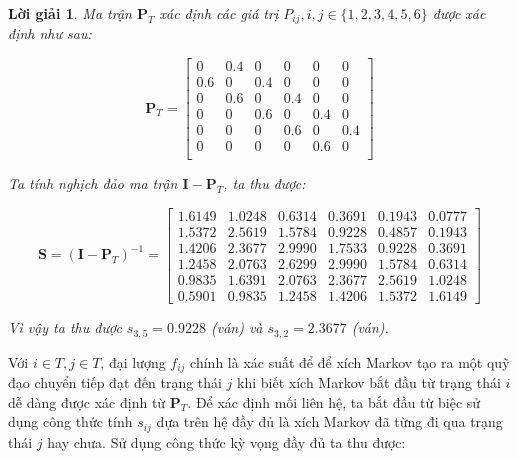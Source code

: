 \documentclass[14pt, a4paper]{article}
\numberwithin{equation}{section}
\numberwithin{figure}{section}
\theoremstyle{sltheorem}
\theoremstyle{soltheorem}
\newtheorem*{loigiai}{Lời giải}
\numberwithin{dl}{section}
\numberwithin{vd}{section}
\begin{document}
    \begin{loigiai}
        Ma trận $\mathbf{P}_T$ xác định các giá trị $P_{ij}, i, j \in \lbrace 1, 2, 3, 4, 5, 6 \rbrace$ được xác định như sau:

        \begin{equation*}
            \mathbf{P}_T = \begin{bmatrix}
                0 & 0.4 & 0 & 0 & 0 & 0 \\
                0.6 & 0 & 0.4 & 0 & 0 & 0 \\
                0 & 0.6 & 0 & 0.4 & 0 & 0 \\
                0 & 0 & 0.6 & 0 & 0.4 & 0 \\
                0 & 0 & 0 & 0.6 & 0 & 0.4 \\
                0 & 0 & 0 & 0 & 0.6 & 0 \\
            \end{bmatrix}
        \end{equation*}

        Ta tính nghịch đảo ma trận $\mathbf{I} - \mathbf{P}_T$, ta thu được:

        \begin{equation*}
            \mathbf{S}=(\mathbf{I}-\mathbf{P}_T)^{-1}=
            \begin{bmatrix}
            1.6149 & 1.0248 & 0.6314 & 0.3691 & 0.1943 & 0.0777 \\
            1.5372 & 2.5619 & 1.5784 & 0.9228 & 0.4857 & 0.1943 \\
            1.4206 & 2.3677 & 2.9990 & 1.7533 & 0.9228 & 0.3691 \\
            1.2458 & 2.0763 & 2.6299 & 2.9990 & 1.5784 & 0.6314 \\
            0.9835 & 1.6391 & 2.0763 & 2.3677 & 2.5619 & 1.0248 \\
            0.5901 & 0.9835 & 1.2458 & 1.4206 & 1.5372 & 1.6149
            \end{bmatrix}
        \end{equation*}

        Vì vậy ta thu được $s_{3,5}=0.9228$ (ván) và $s_{3,2}=2.3677$ (ván).
    \end{loigiai}

    Với $i \in T, j \in T$, đại lượng $f_{ij}$ chính là xác suất để để xích Markov tạo ra một quỹ đạo chuyển tiếp đạt đến trạng thái $j$ khi biết xích Markov bắt đầu từ trạng thái $i$ dễ dàng được xác định từ $\mathbf{P}_T$.
    Để xác định mối liên hệ, ta bắt đầu từ biệc sử dụng công thức tính $s_{ij}$ dựa trên hệ đầy đủ là xích Markov đã từng đi qua trạng thái $j$ hay chưa.
    Sử dụng công thức kỳ vọng đầy đủ ta thu được:
\end{document}
